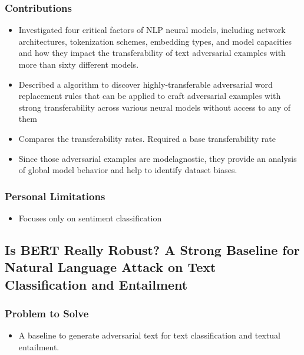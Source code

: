 \documentclass{article}
\begin{document}
\begin{flushleft}
\subsubsection*{Contributions}
\begin{itemize}
  \item  Investigated four critical factors of NLP neural models, including network architectures, tokenization schemes, embedding types, and model capacities and how they impact the transferability of text adversarial examples with more than sixty different models.
  \item Described a algorithm to discover highly-transferable adversarial word replacement rules that can be applied to craft adversarial examples with strong transferability across various neural models without access to any of them
  \item Compares the transferability rates. Required a base transferability rate
  \item Since those adversarial examples are modelagnostic, they provide an analysis of global model behavior and help to identify dataset biases.
\end{itemize}

\subsubsection*{Personal Limitations}
\begin{itemize}
    \item Focuses only on sentiment classification 
\end{itemize}





\subsection{Is BERT Really Robust? A Strong Baseline for Natural Language Attack on Text Classification and Entailment  \cite{jin2020bert}} 
\subsubsection*{Problem to Solve}
\begin{itemize}
    \item A baseline to generate adversarial text for text classification and textual entailment.
\end{itemize}


\end{flushleft}
\end{document}
